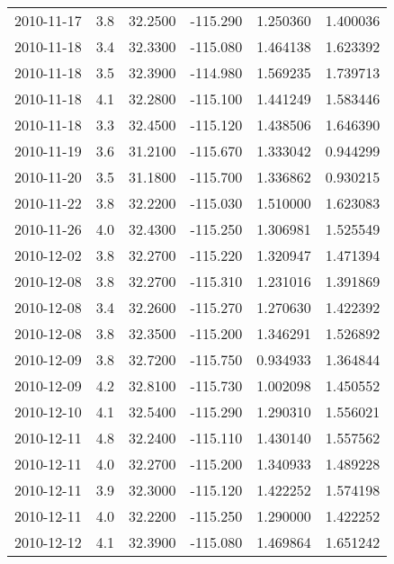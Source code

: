 \begin{tabular}{lrrrrr}
2010-11-17 &       3.8 &  32.2500 &  -115.290 &         1.250360 &         1.400036 \\
2010-11-18 &       3.4 &  32.3300 &  -115.080 &         1.464138 &         1.623392 \\
2010-11-18 &       3.5 &  32.3900 &  -114.980 &         1.569235 &         1.739713 \\
2010-11-18 &       4.1 &  32.2800 &  -115.100 &         1.441249 &         1.583446 \\
2010-11-18 &       3.3 &  32.4500 &  -115.120 &         1.438506 &         1.646390 \\
2010-11-19 &       3.6 &  31.2100 &  -115.670 &         1.333042 &         0.944299 \\
2010-11-20 &       3.5 &  31.1800 &  -115.700 &         1.336862 &         0.930215 \\
2010-11-22 &       3.8 &  32.2200 &  -115.030 &         1.510000 &         1.623083 \\
2010-11-26 &       4.0 &  32.4300 &  -115.250 &         1.306981 &         1.525549 \\
2010-12-02 &       3.8 &  32.2700 &  -115.220 &         1.320947 &         1.471394 \\
2010-12-08 &       3.8 &  32.2700 &  -115.310 &         1.231016 &         1.391869 \\
2010-12-08 &       3.4 &  32.2600 &  -115.270 &         1.270630 &         1.422392 \\
2010-12-08 &       3.8 &  32.3500 &  -115.200 &         1.346291 &         1.526892 \\
2010-12-09 &       3.8 &  32.7200 &  -115.750 &         0.934933 &         1.364844 \\
2010-12-09 &       4.2 &  32.8100 &  -115.730 &         1.002098 &         1.450552 \\
2010-12-10 &       4.1 &  32.5400 &  -115.290 &         1.290310 &         1.556021 \\
2010-12-11 &       4.8 &  32.2400 &  -115.110 &         1.430140 &         1.557562 \\
2010-12-11 &       4.0 &  32.2700 &  -115.200 &         1.340933 &         1.489228 \\
2010-12-11 &       3.9 &  32.3000 &  -115.120 &         1.422252 &         1.574198 \\
2010-12-11 &       4.0 &  32.2200 &  -115.250 &         1.290000 &         1.422252 \\
2010-12-12 &       4.1 &  32.3900 &  -115.080 &         1.469864 &         1.651242 \\

\end{tabular}
